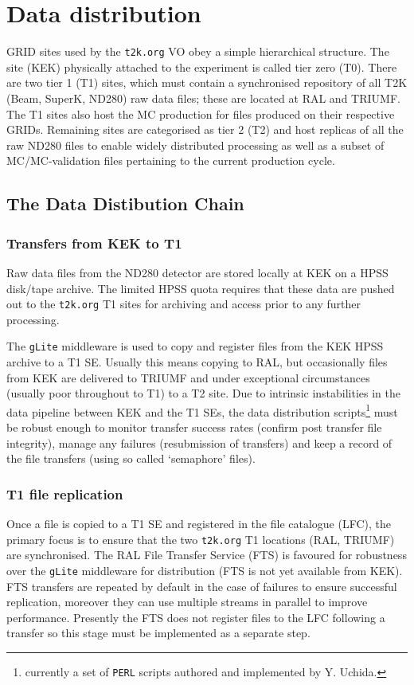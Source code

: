 \documentclass[11pt]{article}
\begin{document}
\clearpage
\section{Data distribution}
\label{sec:dist}

GRID sites used by the \verb+t2k.org+ VO obey a simple hierarchical
structure. The site (KEK) physically attached to the experiment is called
tier zero (T0). There are two tier 1 (T1) sites, which must contain a
synchronised repository of all T2K (Beam, SuperK, ND280) raw data
files; these are located at RAL and TRIUMF. The T1 sites also host the
MC production for files produced on their respective GRIDs.
Remaining sites are categorised as tier 2 (T2) and host replicas of
all the raw ND280 files to enable widely distributed processing as well
as a subset of MC/MC-validation files pertaining to the current
production cycle.

\subsection{The Data Distibution Chain}
\subsubsection*{Transfers from KEK to T1}
Raw data files from the ND280 detector are stored locally at KEK on a
HPSS disk/tape archive. The limited HPSS quota requires that these data are
pushed out to the \verb+t2k.org+ T1 sites for archiving and access
prior to any further processing.

The \verb+gLite+ middleware is used to copy and register files from
the KEK HPSS archive to a T1 SE. Usually this means copying to RAL,
but occasionally files from KEK are delivered to TRIUMF and under
exceptional circumstances (usually poor throughout to T1) to a T2
site. Due to intrinsic instabilities in the data pipeline between KEK
and the T1 SEs, the data distribution scripts\footnote{currently a set
of \texttt{PERL} scripts authored and implemented by Y. Uchida.} must be
robust enough to monitor transfer success rates (confirm post transfer
file integrity), manage any failures (resubmission of transfers) and
keep a record of the file transfers (using so called `semaphore'
files).

\subsubsection*{T1 file replication}
Once a file is copied to a T1 SE and registered in the file catalogue (LFC),
the primary focus is to ensure that the two \verb+t2k.org+ T1 locations (RAL,
TRIUMF) are synchronised. The RAL File Transfer Service (FTS) is
favoured for robustness over the \verb+gLite+ middleware for
distribution (FTS is not yet available from KEK). FTS transfers are
repeated by default in the case of failures to ensure successful
replication, moreover they can use multiple streams in parallel to improve
performance. Presently the FTS does not register files to the LFC
following a transfer so this stage must be implemented as a separate
step.
\end{document}

